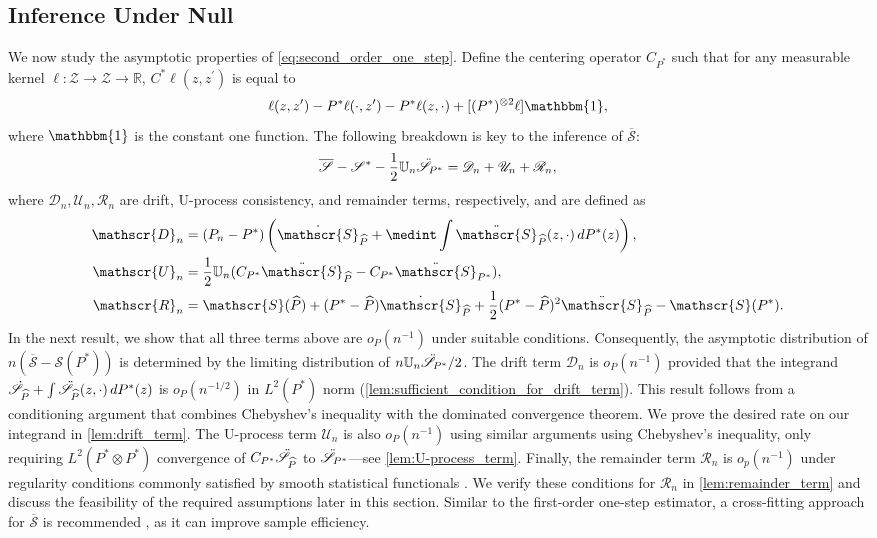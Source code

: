 \documentclass{article}
\theoremstyle{plain}
\theoremstyle{definition}
\theoremstyle{remark}
\newcommand{\R}{\mathbb{R}}
\newcommand{\U}{\mathbb{U}}
\newcommand{\of}[1]{\left(#1\right)}
\newcommand{\cZ}{\mathcal{Z}}
\newcommand{\ucD}{\mathscr{D}}
\newcommand{\ucU}{\mathscr{U}}
\newcommand{\ucR}{\mathscr{R}}
\newcommand{\hP}{\widehat{P}}
\newcommand{\1}{\mathbbm{1}}
\newcommand{\STE}{\mathscr{S}}
\theoremstyle{plain}
\theoremstyle{definition}
\begin{document}
\subsection{Inference Under Null}
We now study the asymptotic properties of \eqref{eq:second_order_one_step}. Define the centering operator $C_{P^*}$ such that for any measurable kernel $\ell: \cZ \to \cZ \to \R$, $C^* \ell (z, z^\prime)$ is equal to
\[
\ell (z, z^\prime) - {P^* \ell(\cdot, z^\prime) - P^* \ell(z, \cdot)} + [(P^*)^{\otimes 2} \ell] \1,
\]
where $\1$ is the constant one function. 
The following breakdown is key to the inference of $\overline{\STE}$:
\[
\overline{\STE} - \STE^* - \frac{1}{2} \U_n \Ddot{\STE}_{P^*} = \ucD_n + \ucU_n + \ucR_n,
\]
where $\ucD_n, \ucU_n, \ucR_n$ are drift, U-process consistency, and remainder terms, respectively, and are defined as
\begin{align*}
     \ucD_n &= (P_n - P^*)\of{\dot{\STE}_{\hP} + \medint\int \Ddot{\STE}_{\hP}(z, \cdot) \, dP^*(z)}, \\
     \ucU_n &= \frac{1}{2} \U_n (C_{P^*} \Ddot{\STE}_{\hP} - C_{P^*}\Ddot{\STE}_{P^*}),\\
     \ucR_n &= \STE(\hP) + (P^* - \hP) \dot{\STE}_{\hP} + \frac{1}{2} (P^* - \hP)^2 \Ddot{\STE}_{\hP} - \STE(P^*).
\end{align*}
In the next result, we show that all three terms above are $o_P(n^{-1})$ under suitable conditions. Consequently, the asymptotic distribution of $n(\overline{\STE} - \STE(P^*))$ is determined by the limiting distribution of $n \U_n \Ddot{\STE}_{P^*} / 2$. The drift term $\ucD_n$ is $o_P(n^{-1})$ provided that the integrand $\dot{\STE}_{\hP} + \int  \Ddot{\STE}_{\hP}(z, \cdot) \, dP^*(z)$ is $o_P(n^{-1/2})$ in $L^2(P^*)$ norm (\cref{lem:sufficient_condition_for_drift_term}). This result follows from a conditioning argument that combines Chebyshev’s inequality with the dominated convergence theorem. We prove the desired rate on our integrand in \cref{lem:drift_term}. 
The U-process term $\ucU_n$ is also $o_P(n^{-1})$ using similar arguments using Chebyshev's inequality, only requiring $L^2(P^* \otimes P^*)$ convergence of $C_{P^*} \Ddot{\STE}_{\hP}$ to $\Ddot{\STE}_{P^*}$---see \cref{lem:U-process_term}. Finally, the remainder term $\ucR_n$ is $o_p(n^{-1})$ under regularity conditions commonly satisfied by smooth statistical functionals \citep{luedtke2019omnibus, robins2009quadratic}. We verify these conditions for $\ucR_n$ in \cref{lem:remainder_term} and discuss the feasibility of the required assumptions later in this section. Similar to the first-order one-step estimator, a cross-fitting approach for $\overline{\STE}$ is recommended \cite{kim2024dimension}, as it can improve sample efficiency.
\end{document}
